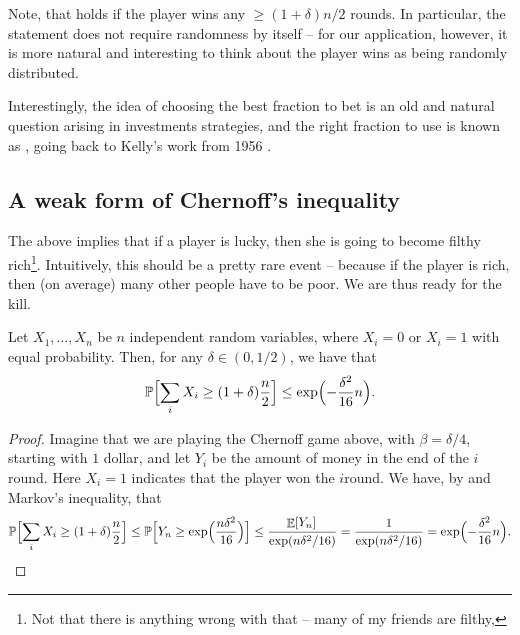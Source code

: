 \begin{remark}
    Note, that  holds if the player wins any
    $\geq (1+\delta)n/2$ rounds. In particular, the statement does not
    require randomness by itself -- for our application, however, it
    is more natural and interesting to think about the player wins as
    being randomly distributed.
\end{remark}

\begin{remark}
    Interestingly, the idea of choosing the best fraction to bet is an
    old and natural question arising in investments strategies, and
    the right fraction to use is known as
    \href{https://en.wikipedia.org/wiki/Kelly_criterion}{}, going back to Kelly's work from 1956
    \cite{k-niir-56}.
\end{remark}

\subsection{A  weak form of Chernoff's inequality}

The above implies that if a player is lucky, then she is going to
become filthy rich\footnote{Not that there is anything wrong with that
   -- many of my friends are filthy,}. Intuitively, this should be a
pretty rare event -- because if the player is rich, then (on average)
many other people have to be poor. We are thus ready for the kill.

\begin{theorem}
    Let $X_1,\ldots, X_n$ be $n$ independent random variables, where
    $X_i=0$ or $X_i=1$ with equal probability. Then, for any $\delta
    \in (0,1/2)$, we have that
    \begin{equation*}
        \ProbLTR \Bigl[ \sum_i X_i \geq (1+\delta)\frac{n}{2} \Bigr]%
        \leq%
        \exp\Bigl( -
        \frac{\delta^2}{ 16} n \Bigr).
    \end{equation*}
\end{theorem}
\begin{proof}
    Imagine that we are playing the Chernoff game above, with
    $\beta=\delta/4$, starting with $1$ dollar, and let $Y_i$ be the
    amount of money in the end of the $i$\th round.  Here $X_i=1$
    indicates that the player won the $i$\th round.  We have, by
     and Markov's inequality, that
    \begin{equation*}
        \ProbLTR \Bigl[{ \sum_i X_i \geq (1+\delta)\frac{n}{2}} \Bigr]%
        \leq %
        \ProbLTR \Bigl[{ Y_n \geq \exp \Bigl( {\frac{n \delta^2}{16}}
           \Bigr)
        } \Bigr] %
        \leq%
        \frac{\Ex{Y_n}\bigl. }{\bigl. \exp\pth{n \delta^2 / 16}}%
        =%
        \frac{1}{\bigl.  \exp\pth{n \delta^2 / 16}} =
        \exp \Bigl( -\frac{\delta^2}{ 16} n  \Bigr).
    \end{equation*}
\end{proof}


